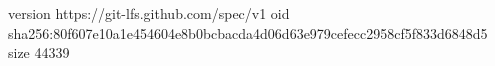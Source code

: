 version https://git-lfs.github.com/spec/v1
oid sha256:80f607e10a1e454604e8b0bcbacda4d06d63e979cefecc2958cf5f833d6848d5
size 44339
